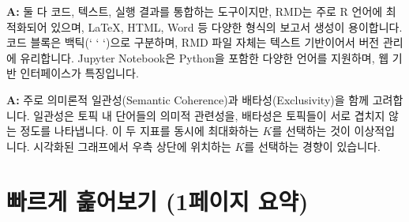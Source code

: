\documentclass[11pt,a4paper]{article}
\begin{document}
\begin{tcolorbox}[title=Q: R Markdown(RMD)은 Jupyter Notebook과 어떻게 다른가요?]
\textbf{A:} 둘 다 코드, 텍스트, 실행 결과를 통합하는 도구이지만, RMD는 주로 R 언어에 최적화되어 있으며, LaTeX, HTML, Word 등 다양한 형식의 보고서 생성이 용이합니다. 코드 블록은 백틱(` ` `)으로 구분하며, RMD 파일 자체는 텍스트 기반이어서 버전 관리에 유리합니다. Jupyter Notebook은 Python을 포함한 다양한 언어를 지원하며, 웹 기반 인터페이스가 특징입니다.
\end{tcolorbox}

\begin{tcolorbox}[title=Q: `searchK()`로 최적 토픽 수 $K$를 찾을 때 어떤 지표를 봐야 하나요?]
\textbf{A:} 주로 의미론적 일관성(Semantic Coherence)과 배타성(Exclusivity)을 함께 고려합니다. 일관성은 토픽 내 단어들의 의미적 관련성을, 배타성은 토픽들이 서로 겹치지 않는 정도를 나타냅니다. 이 두 지표를 동시에 최대화하는 $K$를 선택하는 것이 이상적입니다. 시각화된 그래프에서 우측 상단에 위치하는 $K$를 선택하는 경향이 있습니다.
\end{tcolorbox}

\newpage
\section*{빠르게 훑어보기 (1페이지 요약)}
\end{document}
